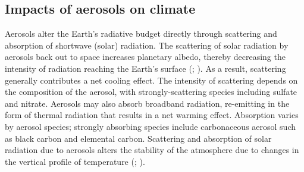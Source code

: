 



\subsection{Impacts of aerosols on climate}

Aerosols alter the Earth's radiative budget directly through scattering and absorption of shortwave (solar) radiation. The scattering of solar radiation by aerosols back out to space increases planetary albedo, thereby decreasing the intensity of radiation reaching the Earth's surface (\cite{charlson_climate_1969}; \cite{charlson_climate_1992}). As a result, scattering generally contributes a net cooling effect. The intensity of scattering depends on the composition of the aerosol, with strongly-scattering species including sulfate and nitrate. Aerosols may also absorb broadband radiation, re-emitting in the form of thermal radiation that results in a net warming effect. Absorption varies by aerosol species; strongly absorbing species include carbonaceous aerosol such as black carbon and elemental carbon. Scattering and absorption of solar radiation due to aerosols alters the stability of the atmosphere due to changes in the vertical profile of temperature (\cite{li_scattering_2022}; \cite{lau_observational_2006}). 

